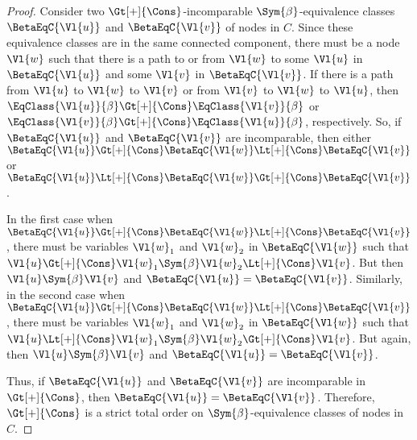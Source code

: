 \begin{proof}
    Consider two $\Gt[+]{\Cons}$-incomparable $\Sym{\beta}$-equivalence classes
    $\BetaEqC{\Vl{u}}$ and $\BetaEqC{\Vl{v}}$ of nodes in $C$. Since these
    equivalence classes are in the same connected component, there must be a
    node $\Vl{w}$ such that there is a path to or from $\Vl{w}$ to some
    $\Vl{u}$ in $\BetaEqC{\Vl{u}}$ and some $\Vl{v}$ in $\BetaEqC{\Vl{v}}$. If
    there is a path from $\Vl{u}$ to $\Vl{w}$ to $\Vl{v}$ or from $\Vl{v}$ to
    $\Vl{w}$ to $\Vl{u}$, then $\EqClass{\Vl{u}}{\beta} \Gt[+]{\Cons}
    \EqClass{\Vl{v}}{\beta}$ or $\EqClass{\Vl{v}}{\beta} \Gt[+]{\Cons}
    \EqClass{\Vl{u}}{\beta}$, respectively. So, if $\BetaEqC{\Vl{u}}$ and
    $\BetaEqC{\Vl{v}}$ are incomparable, then either $\BetaEqC{\Vl{u}}
    \Gt[+]{\Cons} \BetaEqC{\Vl{w}} \Lt[+]{\Cons} \BetaEqC{\Vl{v}}$ or
    $\BetaEqC{\Vl{u}} \Lt[+]{\Cons} \BetaEqC{\Vl{w}} \Gt[+]{\Cons}
    \BetaEqC{\Vl{v}}$.

    In the first case when $\BetaEqC{\Vl{u}} \Gt[+]{\Cons} \BetaEqC{\Vl{w}}
    \Lt[+]{\Cons} \BetaEqC{\Vl{v}}$, there must be variables $\Vl{w}_1$ and
    $\Vl{w}_2$ in $\BetaEqC{\Vl{w}}$ such that $\Vl{u} \Gt[+]{\Cons} \Vl{w}_1
    \Sym{\beta} \Vl{w}_2 \Lt[+]{\Cons} \Vl{v}$. But then $\Vl{u} \Sym{\beta}
    \Vl{v}$ and $\BetaEqC{\Vl{u}} = \BetaEqC{\Vl{v}}$. Similarly, in the second
    case when $\BetaEqC{\Vl{u}} \Gt[+]{\Cons} \BetaEqC{\Vl{w}} \Lt[+]{\Cons}
    \BetaEqC{\Vl{v}}$, there must be variables $\Vl{w}_1$ and $\Vl{w}_2$ in
    $\BetaEqC{\Vl{w}}$ such that $\Vl{u} \Lt[+]{\Cons} \Vl{w}_1 \Sym{\beta}
    \Vl{w}_2 \Gt[+]{\Cons} \Vl{v}$. But again, then $\Vl{u} \Sym{\beta} \Vl{v}$
    and $\BetaEqC{\Vl{u}} = \BetaEqC{\Vl{v}}$.

    Thus, if $\BetaEqC{\Vl{u}}$ and $\BetaEqC{\Vl{v}}$ are incomparable in
    $\Gt[+]{\Cons}$, then $\BetaEqC{\Vl{u}} = \BetaEqC{\Vl{v}}$. Therefore,
    $\Gt[+]{\Cons}$ is a strict total order on $\Sym{\beta}$-equivalence
    classes of nodes in $C$. \end{proof}

